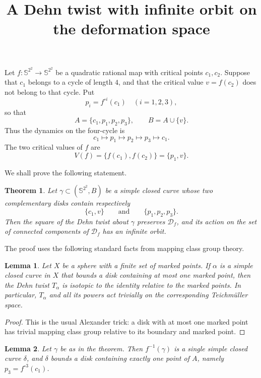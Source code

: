 \documentclass{article}
\newtheorem{theorem}{Theorem}
\newtheorem{lemma}{Lemma}
\newcommand{\Sph}{\mathbb{S}^2}
\newcommand{\Dcal}{\mathcal{D}}
\begin{document}
\title{A Dehn twist with infinite orbit on the deformation space}
\author{}
\date{}
\maketitle

Let $f:\Sph^2\to \Sph^2$ be a quadratic rational map with critical points
$c_1,c_2$. Suppose that $c_1$ belongs to a cycle of length $4$, and that
the critical value $v=f(c_2)$ does not belong to that cycle. Put
\[
p_i=f^{\circ i}(c_1)\quad (i=1,2,3),
\]
so that
\[
A=\{c_1,p_1,p_2,p_3\},\qquad B=A\cup\{v\}.
\]
Thus the dynamics on the four-cycle is
\[
c_1\longmapsto p_1\longmapsto p_2\longmapsto p_3\longmapsto c_1.
\]
The two critical values of $f$ are
\[
V(f)=\{f(c_1),f(c_2)\}=\{p_1,v\}.
\]

We shall prove the following statement.

\begin{theorem}
Let $\gamma\subset (\Sph^2,B)$ be a simple closed curve whose two
complementary disks contain respectively
\[
\{c_1,v\}
\qquad\text{and}\qquad
\{p_1,p_2,p_3\}.
\]
Then the square of the Dehn twist about $\gamma$ preserves
$\Dcal_f$, and its action on the set of connected components of
$\Dcal_f$ has an infinite orbit.
\end{theorem}

The proof uses the following standard facts from mapping class group theory.

\begin{lemma}
\label{lem:trivial-twist}
Let $X$ be a sphere with a finite set of marked points. If $\alpha$ is a
simple closed curve in $X$ that bounds a disk containing at most one
marked point, then the Dehn twist $T_\alpha$ is isotopic to the identity
relative to the marked points. In particular, $T_\alpha$ and all its
powers act trivially on the corresponding Teichm\"uller space.
\end{lemma}

\begin{proof}
This is the usual Alexander trick: a disk with at most one marked point
has trivial mapping class group relative to its boundary and marked point.
\end{proof}

\begin{lemma}
\label{lem:preimage}
Let $\gamma$ be as in the theorem. Then $f^{-1}(\gamma)$ is a single
simple closed curve $\delta$, and $\delta$ bounds a disk containing
exactly one point of $A$, namely $p_3=f^{\circ 3}(c_1)$.
\end{lemma}
\end{document}

